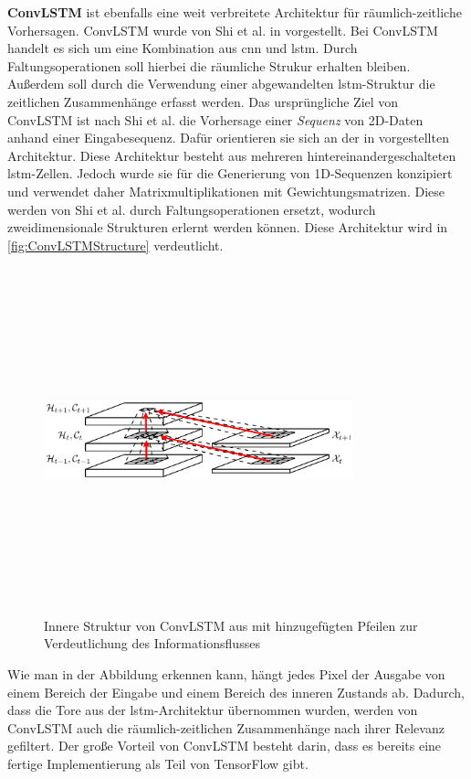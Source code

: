 \textbf{ConvLSTM} ist ebenfalls eine weit verbreitete Architektur für räumlich-zeitliche Vorhersagen.
Conv\-LSTM wurde von Shi et al. in \cite{ConvLSTM} vorgestellt.
Bei ConvLSTM handelt es sich um eine Kombination aus \acrshort{cnn} und \acrshort{lstm}.
Durch Faltungsoperationen soll hierbei die räumliche Strukur erhalten bleiben.
Außerdem soll durch die Verwendung einer abgewandelten \acrshort{lstm}-Struktur die zeitlichen Zusammenhänge erfasst werden.
Das ursprüngliche Ziel von ConvLSTM ist nach Shi et al. die Vorhersage einer \emph{Sequenz} von 2D-Daten anhand einer Eingabesequenz.
Dafür orientieren sie sich an der in \cite{SequenceGeneratingLSTM} vorgestellten Architektur.
Diese Architektur besteht aus mehreren hintereinandergeschalteten \acrshort{lstm}-Zellen.
Jedoch wurde sie für die Generierung von 1D-Sequenzen konzipiert und verwendet daher Matrixmultiplikationen mit Gewichtungsmatrizen.
Diese werden von Shi et al. durch Faltungsoperationen ersetzt, wodurch zweidimensionale Strukturen erlernt werden können.
Diese Architektur wird in \autoref{fig:ConvLSTMStructure} verdeutlicht.

\begin{figure}[h]
    \centering
    \includegraphics[width=0.8\textwidth,height=10cm,keepaspectratio=true]{content/images/ConvLSTMStructure.png}
    \caption{Innere Struktur von ConvLSTM aus \cite{ConvLSTM} mit hinzugefügten Pfeilen zur Verdeutlichung des Informationsflusses}
    \label{fig:ConvLSTMStructure}
\end{figure}

Wie man in der Abbildung erkennen kann, hängt jedes Pixel der Ausgabe von einem Bereich der Eingabe und einem Bereich des inneren Zustands ab.
Dadurch, dass die Tore aus der \acrshort{lstm}-Architektur übernommen wurden, werden von ConvLSTM auch die räumlich-zeitlichen Zusammenhänge nach ihrer Relevanz gefiltert.
Der große Vorteil von ConvLSTM besteht darin, dass es bereits eine fertige Implementierung als Teil von TensorFlow gibt.


